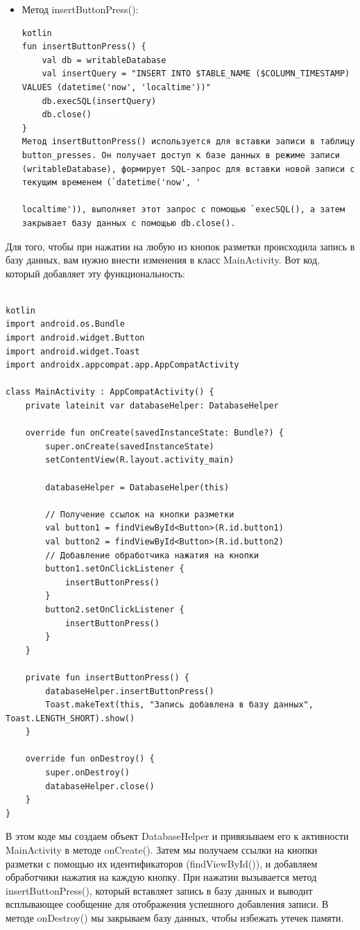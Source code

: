 \documentclass[12pt]{article}
\begin{document}
\begin{itemize}
        \item Метод insertButtonPress():
        \begin{verbatim}
kotlin
fun insertButtonPress() {
    val db = writableDatabase
    val insertQuery = "INSERT INTO $TABLE_NAME ($COLUMN_TIMESTAMP) VALUES (datetime('now', 'localtime'))"
    db.execSQL(insertQuery)
    db.close()
}
Метод insertButtonPress() используется для вставки записи в таблицу button_presses. Он получает доступ к базе данных в режиме записи (writableDatabase), формирует SQL-запрос для вставки новой записи с текущим временем (`datetime('now', '

localtime')), выполняет этот запрос с помощью `execSQL(), а затем закрывает базу данных с помощью db.close().
        \end{verbatim}

    \end{itemize}

    Для того, чтобы при нажатии на любую из кнопок разметки происходила запись в базу данных, вам нужно внести изменения в класс MainActivity. Вот код, который добавляет эту функциональность:
    \begin{verbatim}

kotlin
import android.os.Bundle
import android.widget.Button
import android.widget.Toast
import androidx.appcompat.app.AppCompatActivity

class MainActivity : AppCompatActivity() {
    private lateinit var databaseHelper: DatabaseHelper

    override fun onCreate(savedInstanceState: Bundle?) {
        super.onCreate(savedInstanceState)
        setContentView(R.layout.activity_main)

        databaseHelper = DatabaseHelper(this)

        // Получение ссылок на кнопки разметки
        val button1 = findViewById<Button>(R.id.button1)
        val button2 = findViewById<Button>(R.id.button2)
        // Добавление обработчика нажатия на кнопки
        button1.setOnClickListener {
            insertButtonPress()
        }
        button2.setOnClickListener {
            insertButtonPress()
        }
    }

    private fun insertButtonPress() {
        databaseHelper.insertButtonPress()
        Toast.makeText(this, "Запись добавлена в базу данных", Toast.LENGTH_SHORT).show()
    }

    override fun onDestroy() {
        super.onDestroy()
        databaseHelper.close()
    }
}

    \end{verbatim}
    В этом коде мы создаем объект DatabaseHelper и привязываем его к активности MainActivity в методе onCreate().
    Затем мы получаем ссылки на кнопки разметки с помощью их идентификаторов (findViewById()), и добавляем обработчики нажатия на каждую кнопку.
    При нажатии вызывается метод insertButtonPress(), который вставляет запись в базу данных и выводит всплывающее сообщение для отображения успешного добавления записи.
    В методе onDestroy() мы закрываем базу данных, чтобы избежать утечек памяти.
\end{document}
